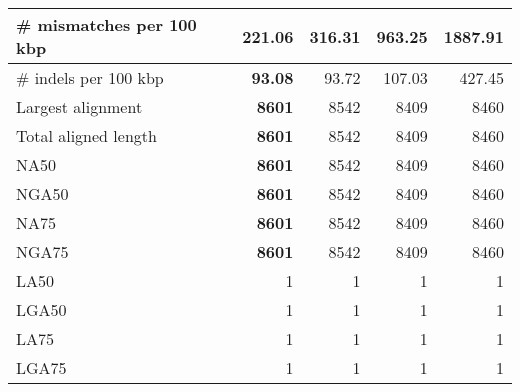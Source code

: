 \documentclass[12pt,a4paper]{article}
\begin{document}
\begin{table}[ht]
\begin{center}
\begin{tabular}{|l*{4}{|r}|}
\# mismatches per 100 kbp & {\bf 221.06} & 316.31 & 963.25 & 1887.91 \\ \hline
\# indels per 100 kbp & {\bf 93.08} & 93.72 & 107.03 & 427.45 \\ \hline
Largest alignment & {\bf 8601} & 8542 & 8409 & 8460 \\ \hline
Total aligned length & {\bf 8601} & 8542 & 8409 & 8460 \\ \hline
NA50 & {\bf 8601} & 8542 & 8409 & 8460 \\ \hline
NGA50 & {\bf 8601} & 8542 & 8409 & 8460 \\ \hline
NA75 & {\bf 8601} & 8542 & 8409 & 8460 \\ \hline
NGA75 & {\bf 8601} & 8542 & 8409 & 8460 \\ \hline
LA50 & 1 & 1 & 1 & 1 \\ \hline
LGA50 & 1 & 1 & 1 & 1 \\ \hline
LA75 & 1 & 1 & 1 & 1 \\ \hline
LGA75 & 1 & 1 & 1 & 1 \\ \hline
\end{tabular}
\end{center}
\end{table}
\end{document}
